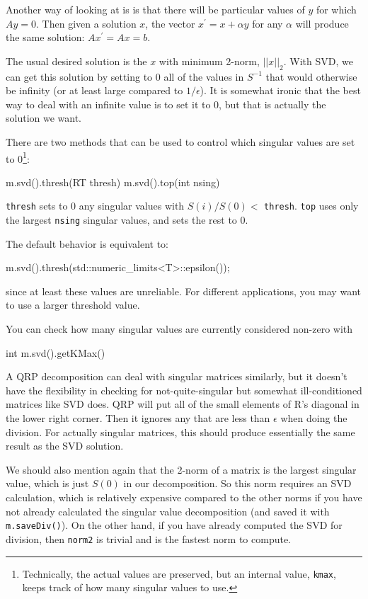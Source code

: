\documentclass[twoside,letterpaper,11pt]{article}
\renewcommand{\tt}[1]{{\lstinline {#1}}}
\begin{document}
Another way of looking at is is that there will be particular values of $y$ 
for which $A y = 0$.
Then given a solution $x$, the vector $x^\prime = x + \alpha y$ for any $\alpha$
will produce 
the same solution: $A x^\prime = A x = b$.

The usual desired solution is the $x$ with minimum 2-norm, $||x||_2$.
With SVD, we can get this solution by setting to 0 all of the values
in $S^{-1}$ that would otherwise be infinity (or at least large compared
to $1/\epsilon$).  It is somewhat ironic that the best way to deal with 
an infinite value is to set it to 0, but that is actually the solution we want.

There are two methods that can be used to control which 
singular values are set to 0\footnote{Technically, the actual values are preserved,
but an internal value, \tt{kmax}, keeps track of how many singular values to use.}:
\begin{tmvcode}
m.svd().thresh(RT thresh)
m.svd().top(int nsing)
\end{tmvcode}
\tt{thresh} sets to 0 any singular values with $S(i)/S(0) <$ \tt{thresh}.
\tt{top} uses only the largest \tt{nsing} singular values, and sets the rest to 0.

The default behavior is equivalent to:
\begin{tmvcode}
m.svd().thresh(std::numeric_limits<T>::epsilon());
\end{tmvcode}
since at least these values are unreliable.  For different applications,
you may want to use a larger threshold value.

You can check how many singular values are currently considered non-zero with
\begin{tmvcode}
int m.svd().getKMax()
\end{tmvcode}

A QRP decomposition can deal with singular matrices similarly,
but it doesn't have the flexibility in checking for not-quite-singular
but somewhat ill-conditioned matrices like SVD does.
QRP will put all of the small elements of R's diagonal in the 
lower right corner.  Then it ignores any that are less than 
$\epsilon$ when doing the division.  For actually singular matrices,
this should produce essentially the same result as the SVD solution.

We should also mention again that the 2-norm of a matrix is the 
largest singular value, which is just $S(0)$ in our decomposition.
So this norm requires an SVD calculation, 
which is relatively expensive compared to the other norms
if you have not already calculated the singular value decomposition
(and saved it with \tt{m.saveDiv()}).  On the other hand, if you have already
computed the SVD for division, then \tt{norm2} is trivial and is the 
fastest norm to compute.
\end{document}
